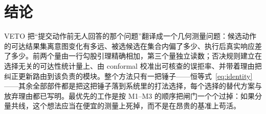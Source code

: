 \documentclass[11pt,a4paper]{ctexart}
\begin{document}
\section{结论}

VETO 把``提交动作前无人回答的那个问题''翻译成一个几何测量问题：候选动作的可达结果集离意图变化有多远、被选候选在集合内偏了多少、执行后真实响应差了多少。前两个量由一行勾股引理精确相加，第三个量独立读数；否决规则建立在选择无关的可达性统计量上、由 conformal 校准出可核查的误拒率、并带着理由把纠正更新路由到该负责的模块。整个方法只有一把锤子——恒等式~\eqref{eq:identity}——其余全部部件都是把这把锤子落到系统里的打法选择，每个选择的替代方案与放弃理由都已写明。最优先的工作是按 M1--M3 的顺序把闸门一个个过掉：如果分量共线，这个想法应当在便宜的测量上死掉，而不是在昂贵的基准上苟活。
\end{document}
